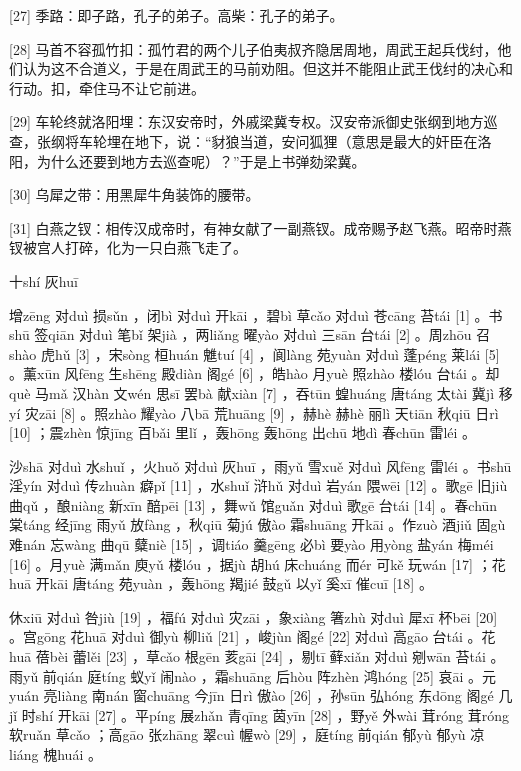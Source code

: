 \documentclass[12pt,UTF8]{ctexbook}
\begin{document}
[27] 季路：即子路，孔子的弟子。高柴：孔子的弟子。

[28] 马首不容孤竹扣：孤竹君的两个儿子伯夷叔齐隐居周地，周武王起兵伐纣，他们认为这不合道义，于是在周武王的马前劝阻。但这并不能阻止武王伐纣的决心和行动。扣，牵住马不让它前进。

[29] 车轮终就洛阳埋：东汉安帝时，外戚梁冀专权。汉安帝派御史张纲到地方巡查，张纲将车轮埋在地下，说：“豺狼当道，安问狐狸（意思是最大的奸臣在洛阳，为什么还要到地方去巡查呢）？”于是上书弹劾梁冀。

[30] 乌犀之带：用黑犀牛角装饰的腰带。

[31] 白燕之钗：相传汉成帝时，有神女献了一副燕钗。成帝赐予赵飞燕。昭帝时燕钗被宫人打碎，化为一只白燕飞走了。





十shí 灰huī


增zēng 对duì 损sǔn ，闭bì 对duì 开kāi ，碧bì 草cǎo 对duì 苍cāng 苔tái [1] 。书shū 签qiān 对duì 笔bǐ 架jià ，两liǎng 曜yào 对duì 三sān 台tái [2] 。周zhōu 召shào 虎hǔ [3] ，宋sòng 桓huán 魋tuí [4] ，阆làng 苑yuàn 对duì 蓬péng 莱lái [5] 。薰xūn 风fēng 生shēng 殿diàn 阁gé [6] ，皓hào 月yuè 照zhào 楼lóu 台tái 。却què 马mǎ 汉hàn 文wén 思sī 罢bà 献xiàn [7] ，吞tūn 蝗huáng 唐táng 太tài 冀jì 移yí 灾zāi [8] 。照zhào 耀yào 八bā 荒huāng [9] ，赫hè 赫hè 丽lì 天tiān 秋qiū 日rì [10] ；震zhèn 惊jīng 百bǎi 里lǐ ，轰hōng 轰hōng 出chū 地dì 春chūn 雷léi 。

沙shā 对duì 水shuǐ ，火huǒ 对duì 灰huī ，雨yǔ 雪xuě 对duì 风fēng 雷léi 。书shū 淫yín 对duì 传zhuàn 癖pǐ [11] ，水shuǐ 浒hǔ 对duì 岩yán 隈wēi [12] 。歌gē 旧jiù 曲qǔ ，酿niàng 新xīn 醅pēi [13] ，舞wǔ 馆guǎn 对duì 歌gē 台tái [14] 。春chūn 棠táng 经jīng 雨yǔ 放fàng ，秋qiū 菊jú 傲ào 霜shuāng 开kāi 。作zuò 酒jiǔ 固gù 难nán 忘wàng 曲qū 糵niè [15] ，调tiáo 羹gēng 必bì 要yào 用yòng 盐yán 梅méi [16] 。月yuè 满mǎn 庾yǔ 楼lóu ，据jù 胡hú 床chuáng 而ér 可kě 玩wán [17] ；花huā 开kāi 唐táng 苑yuàn ，轰hōng 羯jié 鼓gǔ 以yǐ 奚xī 催cuī [18] 。

休xiū 对duì 咎jiù [19] ，福fú 对duì 灾zāi ，象xiàng 箸zhù 对duì 犀xī 杯bēi [20] 。宫gōng 花huā 对duì 御yù 柳liǔ [21] ，峻jùn 阁gé [22] 对duì 高gāo 台tái 。花huā 蓓bèi 蕾lěi [23] ，草cǎo 根gēn 荄gāi [24] ，剔tī 藓xiǎn 对duì 剜wān 苔tái 。雨yǔ 前qián 庭tíng 蚁yǐ 闹nào ，霜shuāng 后hòu 阵zhèn 鸿hóng [25] 哀āi 。元yuán 亮liàng 南nán 窗chuāng 今jīn 日rì 傲ào [26] ，孙sūn 弘hóng 东dōng 阁gé 几jǐ 时shí 开kāi [27] 。平píng 展zhǎn 青qīng 茵yīn [28] ，野yě 外wài 茸róng 茸róng 软ruǎn 草cǎo ；高gāo 张zhāng 翠cuì 幄wò [29] ，庭tíng 前qián 郁yù 郁yù 凉liáng 槐huái 。
\end{document}
